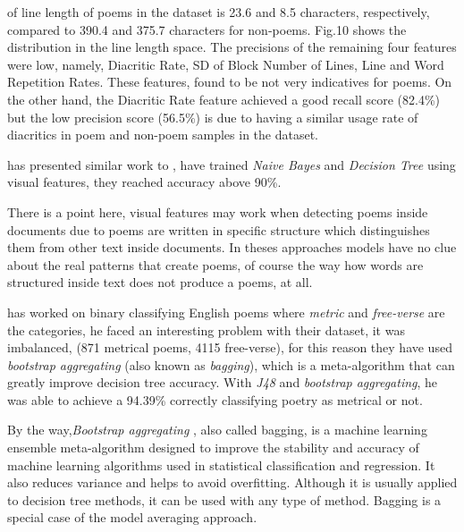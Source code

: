 \documentclass[12pt]{report}
\begin{document}
of line length of poems in the dataset is 23.6 and 8.5 characters, respectively, compared to 390.4 and 375.7
characters for non-poems. Fig.10 shows the distribution in the line length space.
The precisions of the remaining four features were low, namely, Diacritic Rate, SD of Block Number of Lines,
Line and Word Repetition Rates. These features, found to be not very indicatives for poems. On the other hand,
the Diacritic Rate feature achieved a good recall score (82.4\%) but the low
precision score (56.5\%) is due to
having a similar usage rate of diacritics in poem and non-poem samples in the dataset. 








\citet{Tizhoosh2006a} has presented similar work to \citet{Almuhareb2015}, have
trained \textit{Naive Bayes} and \textit{Decision Tree}
using visual features, they reached accuracy above 90\%.

There is a point here, visual features may work when detecting poems inside
documents due to poems are written in specific structure which distinguishes
them from other text inside documents. In theses approaches models have no clue
about the real patterns that create poems, of course the way how words are structured
inside text does not produce a poems, at all.


\citet{Tanasescu2016} has worked on binary classifying English poems where
\textit{metric} and \textit{free-verse} are the categories, he faced an
interesting problem with their dataset, it was imbalanced, (871 metrical poems,
4115 free-verse), for this reason they have used \textit{bootstrap aggregating}
(also known as \textit{bagging}), which is a meta-algorithm that can greatly
improve decision tree accuracy.  With \textit{J48} and \textit{bootstrap
aggregating}, he was able to achieve a 94.39\% correctly classifying poetry as
metrical or not.

By the way,\textit{Bootstrap aggregating} , also called bagging, is a machine learning
ensemble meta-algorithm designed to improve the stability and accuracy of machine
learning algorithms used in statistical classification and regression. It also
reduces variance and helps to avoid overfitting. Although it is usually applied
to decision tree methods, it can be used with any type of method. Bagging is a
special case of the model averaging approach.
\end{document}
